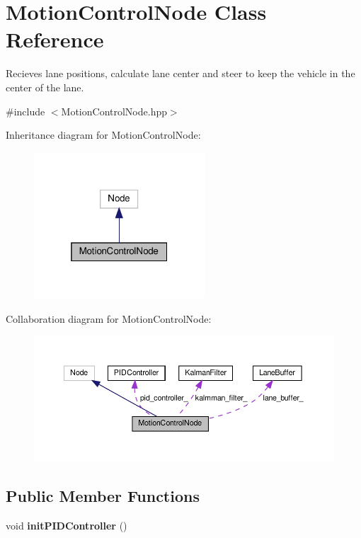 \hypertarget{classMotionControlNode}{}\section{Motion\+Control\+Node Class Reference}
\label{classMotionControlNode}


Recieves lane positions, calculate lane center and steer to keep the vehicle in the center of the lane.  




{\ttfamily \#include $<$Motion\+Control\+Node.\+hpp$>$}



Inheritance diagram for Motion\+Control\+Node\+:
\nopagebreak
\begin{figure}[H]
\begin{center}
\leavevmode
\includegraphics[width=181pt]{classMotionControlNode__inherit__graph}
\end{center}
\end{figure}


Collaboration diagram for Motion\+Control\+Node\+:
\nopagebreak
\begin{figure}[H]
\begin{center}
\leavevmode
\includegraphics[width=350pt]{classMotionControlNode__coll__graph}
\end{center}
\end{figure}
\subsection*{Public Member Functions}
\begin{DoxyCompactItemize}
\item 
\mbox{\label{classMotionControlNode_ad1497ac89b446c40635e05da0313b922}} 
void {\bfseries init\+P\+I\+D\+Controller} ()
\end{DoxyCompactItemize}

